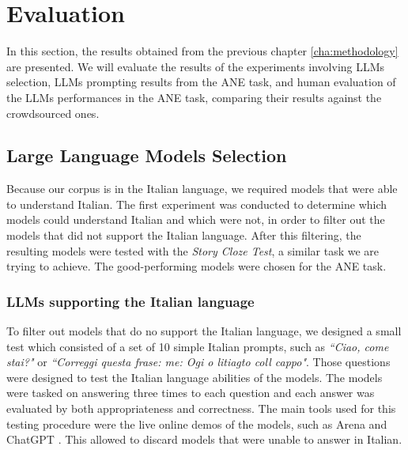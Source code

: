 \chapter{Evaluation}
\label{cha:evaluation}

In this section, the results obtained from the previous chapter \ref{cha:methodology} are presented. We will evaluate the results of the experiments involving LLMs selection, LLMs prompting results from the ANE task, and human evaluation of the LLMs performances in the ANE task, comparing their results against the crowdsourced ones.

\section{Large Language Models Selection}
\label{cha:evaluation-LLMs-selection}

Because our corpus is in the Italian language, we required models that were able to understand Italian. The first experiment was conducted to determine which models could understand Italian and which were not, in order to filter out the models that did not support the Italian language. After this filtering, the resulting models were tested with the \emph{Story Cloze Test}, a similar task we are trying to achieve. The good-performing models were chosen for the ANE task.%

\subsection{LLMs supporting the Italian language}
To filter out models that do no support the Italian language, we designed a small test which consisted of a set of 10 simple Italian prompts, such as \emph{``Ciao, come stai?"} or \emph{``Correggi questa frase: me: Ogi o litiagto coll cappo"}. Those questions were designed to test the Italian language abilities of the models. The models were tasked on answering three times to each question and each answer was evaluated by both appropriateness and correctness. The main tools used for this testing procedure were the live online demos of the models, such as Arena \cite{arena} and ChatGPT \cite{chatgpt}. This allowed to discard models that were unable to answer in Italian.

